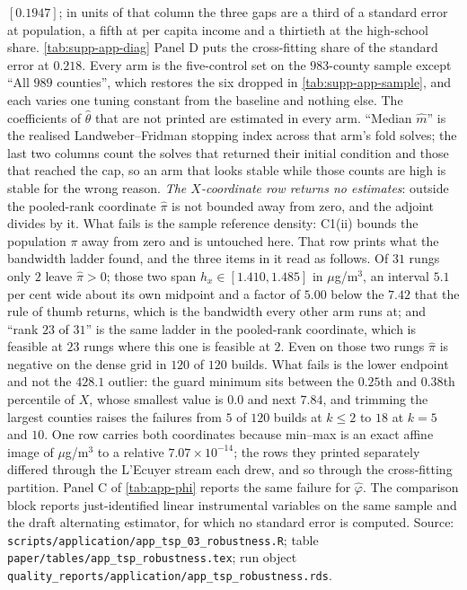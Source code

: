 \documentclass[
  12pt]{article}
\newcommand{\1}[1]{\mathds{1}\left[#1\right]}
\theoremstyle{plain}
\theoremstyle{definition}
\theoremstyle{definition}
\theoremstyle{remark}
\begin{document}
\begin{landscape}
$[0.1947]$; in units of that column the three gaps are a third of a
standard error at population, a fifth at per capita income and a thirtieth at
the high-school share. \cref{tab:supp-app-diag} Panel D puts the cross-fitting
share of the standard error at $0.218$.
Every arm is the five-control set on the $983$-county
sample except ``All $989$ counties'', which restores the six dropped in
\cref{tab:supp-app-sample}, and each varies one tuning constant from the
baseline and nothing else. The coefficients of $\hat\theta$ that are not
printed are estimated in every arm.
``Median $\hat m$'' is the realised Landweber--Fridman stopping
index across that arm's fold solves; the last two columns count the solves that
returned their initial condition and those that reached the cap, so an
arm that looks stable while those counts are high is stable for the wrong
reason. \emph{The $X$-coordinate row returns no estimates}: outside the
pooled-rank coordinate $\hat\pi$ is not bounded away from zero, and the
adjoint divides by it. What fails is the sample reference density: C1(ii)
bounds the population $\pi$ away from zero and is untouched here. That row prints what the bandwidth ladder found,
and the three items in it read as follows. Of $31$ rungs only $2$ leave
$\hat\pi>0$; those two span $h_x\in[1.410,1.485]$ in $\mu$g/m$^{3}$, an interval
$5.1$ per cent wide about its own midpoint and a factor of $5.00$ below the
$7.42$ that the rule of thumb returns, which is the bandwidth every other arm
runs at; and ``rank $23$ of $31$'' is the same ladder in the pooled-rank
coordinate, which is feasible at $23$ rungs where this one is feasible at $2$.
Even on those two rungs $\hat\pi$ is negative on the dense grid in $120$ of
$120$ builds. What fails is the lower endpoint and not
the $428.1$ outlier: the guard minimum sits between the $0.25$th and $0.38$th
percentile of $X$, whose smallest value is $0.0$ and next $7.84$, and trimming
the largest counties raises the failures from $5$ of $120$ builds at $k\leq2$ to
$18$ at $k=5$ and $10$. One row carries both coordinates because min--max is an
exact affine image of $\mu$g/m$^3$ to a relative $7.07\times10^{-14}$; the rows
they printed separately differed through the L'Ecuyer stream each drew, and so
through the cross-fitting partition. Panel C of \cref{tab:app-phi} reports
the same failure for $\hat\varphi$. The
comparison block reports just-identified linear
instrumental variables on the same sample and the draft alternating estimator,
for which no standard error is computed. Source: \texttt{scripts/application/app\_tsp\_03\_robustness.R}; table
\texttt{paper/tables/app\_tsp\_robustness.tex}; run object
\texttt{quality\_reports/application/app\_tsp\_robustness.rds}.
\par\endgroup
\end{landscape}
\end{document}
